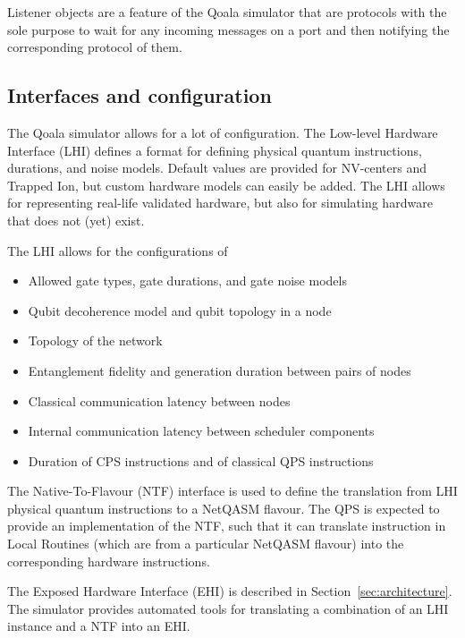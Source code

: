 Listener objects are a feature of the Qoala simulator that are protocols with the sole purpose to wait for any incoming messages on a port and then notifying the corresponding protocol of them.

\subsection{Interfaces and configuration}
The Qoala simulator allows for a lot of configuration.
The Low-level Hardware Interface (LHI) defines a format for defining physical quantum instructions, durations, and noise models.
Default values are provided for NV-centers and Trapped Ion, but custom hardware models can easily be added.
The LHI allows for representing real-life validated hardware, but also for simulating hardware that does not (yet) exist.

The LHI allows for the configurations of
\begin{itemize}
    \item Allowed gate types, gate durations, and gate noise models
    \item Qubit decoherence model and qubit topology in a node
    \item Topology of the network
    \item Entanglement fidelity and generation duration between pairs of nodes
    \item Classical communication latency between nodes
    \item Internal communication latency between scheduler components
    \item Duration of CPS instructions and of classical QPS instructions
\end{itemize}

The Native-To-Flavour (NTF) interface is used to define the translation from LHI physical quantum instructions to a NetQASM flavour.
The QPS is expected to provide an implementation of the NTF, such that it can translate instruction in Local Routines (which are from a particular NetQASM flavour) into the corresponding hardware instructions.

The Exposed Hardware Interface (EHI) is described in Section~\ref{sec:architecture}.
The simulator provides automated tools for translating a combination of an LHI instance and a NTF into an EHI.

